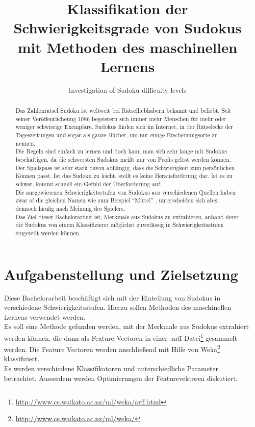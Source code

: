 \documentclass[accentcolor=tud6b,11pt,paper=a4]{tudreport}
\title{Klassifikation der Schwierigkeitsgrade von Sudokus mit Methoden des maschinellen Lernens}
\subtitle{Investigation of Sudoku difficulty levels}
\begin{document}
\maketitle

\begin{abstract}
Das Zahlenrätsel Sudoku ist weltweit bei Rätselliebhabern bekannt und beliebt. Seit seiner Veröffentlicheung 1986 begeistern sich immer mehr Menschen für mehr oder weniger schwierige Exemplare. Sudokus finden sich im Internet, in der Rätselecke der Tageszeitungen und sogar als ganze Bücher, um nur einige Erscheinungsorte zu nennen. \\
Die Regeln sind einfach zu lernen und doch kann man sich sehr lange mit Sudokus beschäftigen, da die schwersten Sudokus meißt nur von Profis gelöst werden können.\\
Der Spielspass ist sehr stark davon abhängig, dass die Schwierigkeit zum persönlichen Können passt. Ist das Sudoku zu leicht, stellt es keine Herausforderung dar. Ist es zu schwer, kommt schnell ein Gefühl der Überforderung auf. \\
Die ausgewiesenen Schwierigkeitsstufen von Sudokus aus verschiedenen Quellen haben zwar of die gleichen Namen wie zum Beispiel 
\textquotedblleft Mittel\textquotedblright
, unterscheiden sich aber dennoch häufig nach Meinung des Spielers.\\
Das Ziel dieser Bachelorarbeit ist, Merkmale aus Sudokus zu extrahieren, anhand derer die Sudokus von einem Klassifizierer möglichst zuverlässig in Schwierigkeitsstufen eingeteilt werden können.\\
\end{abstract}

\tableofcontents

\chapter{Aufgabenstellung und Zielsetzung}
Diese Bachelorarbeit beschäftigt sich mit der Einteilung von Sudokus in verschiedene Schwierigkeitsstufen. Hierzu sollen Methoden des maschinellen Lernens verwendet werden. \\ Es soll eine Methode gefunden werden, mit der Merkmale aus Sudokus extrahiert werden können, die dann als Feature Vectoren in einer .arff Datei\footnote{\url{http://www.cs.waikato.ac.nz/ml/weka/arff.html}} gesammelt werden. Die Feature Vectoren werden anschließend mit Hilfe von Weka\footnote{\url{http://www.cs.waikato.ac.nz/ml/weka/}} klassifiziert.\\
Es werden verschiedene Klassifikatoren und unterschiedliche Parameter betrachtet. Ausserdem werden Optimierungen der Featurevektoren diskutiert.
\end{document}
